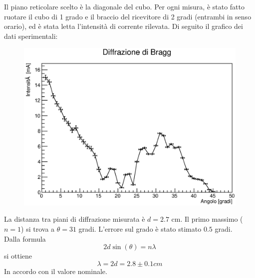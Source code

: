 Il piano reticolare scelto è la diagonale del cubo.
Per ogni misura, è stato fatto ruotare il cubo di 1 grado e il braccio del ricevitore di 2 gradi (entrambi in senso orario), ed è stata letta l'intensità di corrente rilevata. Di seguito il grafico dei dati sperimentali:

    
    \begin{figure}[H]
    \centering
    \includegraphics[scale=0.8]{Grafici/O4_P3_Bragg.eps}
    \label{fig:O4_P3_Bragg}
    \end{figure} 
%
La distanza tra piani di diffrazione misurata è $d = 2.7$ cm. Il primo massimo ($n = 1$) si trova a $ \theta = 31$ gradi. L'errore sul grado è stato stimato $0.5$ gradi.\\
%
Dalla formula $$2 d \sin(\theta) = n \lambda $$
si ottiene 
$$ \lambda = 2d = 2.8 \pm 0.1 cm $$
In accordo con il valore nominale.
%
